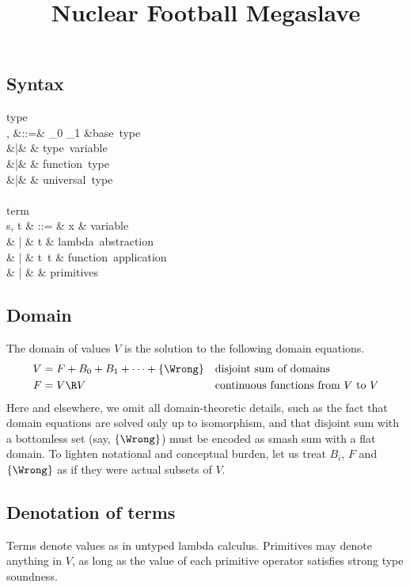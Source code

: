 \documentclass{amsart}
\title{Nuclear Football Megaslave}
\theoremstyle{definition}
\begin{document}
\maketitle
\tableofcontents

\subsection{Syntax}
\begin{syntax}
\mbox{type}\\
\sigma, \tau
&::=& \iota_0 \Or \iota_1 \Or \cdots &\mbox{base type}\\
&|& \alpha \Or \beta \Or \cdots & \mbox{type variable} \\
&|& \tau \rightarrow \tau & \mbox{function type} \\
&|& \All\alpha\tau & \mbox{universal type}
\\
\\
\mbox{term}\\
s, t & ::= & x & \mbox{variable} \\
& | & t  & \mbox{lambda abstraction} \\
& | & t~t & \mbox{function application} \\
& | & \cdots & \mbox{primitives}
\end{syntax}

\subsection{Domain}
The domain of values $V$ is the solution to the following domain
equations.
\begin{align*}
V &= F + B_0 + B_1 + \cdots + \{\Wrong\}
  &&\mbox{disjoint sum of domains}\\
F &= V \R V &&\mbox{continuous functions from $V$ to $V$}
\end{align*}
Here and elsewhere, we omit all domain-theoretic details, such as
the fact that domain equations are solved only up to isomorphism,
and that disjoint sum with a bottomless set (say, $\{\Wrong\}$)
must be encoded as smash sum with a flat domain. To lighten
notational and conceptual burden, let us treat $B_i$, $F$ and
$\{\Wrong\}$ as if they were actual subsets of $V$.

\subsection{Denotation of terms}
\label{denotation-terms}
Terms denote values as in untyped lambda calculus. Primitives may
denote anything in $V$, as long as the value of each primitive
operator satisfies strong type soundness.
\end{document}
